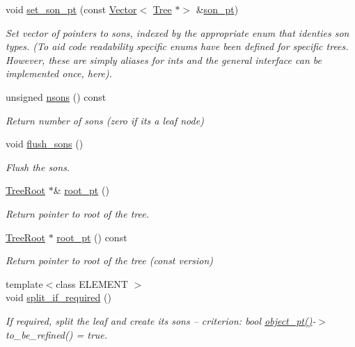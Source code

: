 \begin{DoxyCompactItemize}
void \hyperlink{classoomph_1_1Tree_a0e3a4700ea3023be0f38427286abba56}{set\+\_\+son\+\_\+pt} (const \hyperlink{classoomph_1_1Vector}{Vector}$<$ \hyperlink{classoomph_1_1Tree}{Tree} $\ast$$>$ \&\hyperlink{classoomph_1_1Tree_ab2ca6416d7a368e29da6a6a998f460c7}{son\+\_\+pt})
\begin{DoxyCompactList}\small\item\em Set vector of pointers to sons, indexed by the appropriate enum that identies son types. (To aid code readability specific enums have been defined for specific trees. However, these are simply aliases for ints and the general interface can be implemented once, here). \end{DoxyCompactList}\item 
unsigned \hyperlink{classoomph_1_1Tree_a31e4123b40f6fb52d180a154c9123e85}{nsons} () const
\begin{DoxyCompactList}\small\item\em Return number of sons (zero if it\textquotesingle{}s a leaf node) \end{DoxyCompactList}\item 
void \hyperlink{classoomph_1_1Tree_a34df656d2f298dbbdf60e7890a3dff2f}{flush\+\_\+sons} ()
\begin{DoxyCompactList}\small\item\em Flush the sons. \end{DoxyCompactList}\item 
\hyperlink{classoomph_1_1TreeRoot}{Tree\+Root} $\ast$\& \hyperlink{classoomph_1_1Tree_ae48479dc463d2a8f10400b4b00643a27}{root\+\_\+pt} ()
\begin{DoxyCompactList}\small\item\em Return pointer to root of the tree. \end{DoxyCompactList}\item 
\hyperlink{classoomph_1_1TreeRoot}{Tree\+Root} $\ast$ \hyperlink{classoomph_1_1Tree_a3e4dee01da0a463c4a3a5be574943632}{root\+\_\+pt} () const
\begin{DoxyCompactList}\small\item\em Return pointer to root of the tree (const version) \end{DoxyCompactList}\item 
{\footnotesize template$<$class E\+L\+E\+M\+E\+NT $>$ }\\void \hyperlink{classoomph_1_1Tree_a975ccfd63ffa14a04f14a37b3d2ff931}{split\+\_\+if\+\_\+required} ()
\begin{DoxyCompactList}\small\item\em If required, split the leaf and create its sons -- criterion\+: bool \hyperlink{classoomph_1_1Tree_a2f2eeb0f1dd161f696cccc652974ff4c}{object\+\_\+pt()}-\/$>$ to\+\_\+be\+\_\+refined() = true. \end{DoxyCompactList}\item 
$$
\end{DoxyCompactItemize}
